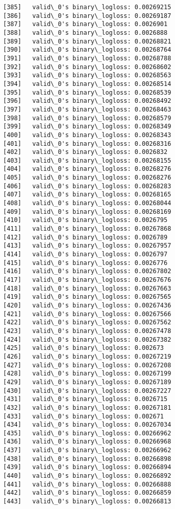 \documentclass[11pt]{article}
\begin{document}
\begin{Verbatim}[commandchars=\\\{\}]
[385]	valid\_0's binary\_logloss: 0.00269215
[386]	valid\_0's binary\_logloss: 0.00269187
[387]	valid\_0's binary\_logloss: 0.0026901
[388]	valid\_0's binary\_logloss: 0.0026888
[389]	valid\_0's binary\_logloss: 0.00268821
[390]	valid\_0's binary\_logloss: 0.00268764
[391]	valid\_0's binary\_logloss: 0.00268788
[392]	valid\_0's binary\_logloss: 0.00268602
[393]	valid\_0's binary\_logloss: 0.00268563
[394]	valid\_0's binary\_logloss: 0.00268514
[395]	valid\_0's binary\_logloss: 0.00268539
[396]	valid\_0's binary\_logloss: 0.00268492
[397]	valid\_0's binary\_logloss: 0.00268463
[398]	valid\_0's binary\_logloss: 0.00268579
[399]	valid\_0's binary\_logloss: 0.00268349
[400]	valid\_0's binary\_logloss: 0.00268343
[401]	valid\_0's binary\_logloss: 0.00268316
[402]	valid\_0's binary\_logloss: 0.0026832
[403]	valid\_0's binary\_logloss: 0.00268155
[404]	valid\_0's binary\_logloss: 0.00268276
[405]	valid\_0's binary\_logloss: 0.00268276
[406]	valid\_0's binary\_logloss: 0.00268283
[407]	valid\_0's binary\_logloss: 0.00268165
[408]	valid\_0's binary\_logloss: 0.00268044
[409]	valid\_0's binary\_logloss: 0.00268169
[410]	valid\_0's binary\_logloss: 0.0026795
[411]	valid\_0's binary\_logloss: 0.00267868
[412]	valid\_0's binary\_logloss: 0.0026789
[413]	valid\_0's binary\_logloss: 0.00267957
[414]	valid\_0's binary\_logloss: 0.0026797
[415]	valid\_0's binary\_logloss: 0.0026776
[416]	valid\_0's binary\_logloss: 0.00267802
[417]	valid\_0's binary\_logloss: 0.00267676
[418]	valid\_0's binary\_logloss: 0.00267663
[419]	valid\_0's binary\_logloss: 0.00267565
[420]	valid\_0's binary\_logloss: 0.00267436
[421]	valid\_0's binary\_logloss: 0.00267566
[422]	valid\_0's binary\_logloss: 0.00267562
[423]	valid\_0's binary\_logloss: 0.00267478
[424]	valid\_0's binary\_logloss: 0.00267382
[425]	valid\_0's binary\_logloss: 0.002673
[426]	valid\_0's binary\_logloss: 0.00267219
[427]	valid\_0's binary\_logloss: 0.00267208
[428]	valid\_0's binary\_logloss: 0.00267199
[429]	valid\_0's binary\_logloss: 0.00267189
[430]	valid\_0's binary\_logloss: 0.00267227
[431]	valid\_0's binary\_logloss: 0.0026715
[432]	valid\_0's binary\_logloss: 0.00267181
[433]	valid\_0's binary\_logloss: 0.002671
[434]	valid\_0's binary\_logloss: 0.00267034
[435]	valid\_0's binary\_logloss: 0.00266962
[436]	valid\_0's binary\_logloss: 0.00266968
[437]	valid\_0's binary\_logloss: 0.00266962
[438]	valid\_0's binary\_logloss: 0.00266898
[439]	valid\_0's binary\_logloss: 0.00266894
[440]	valid\_0's binary\_logloss: 0.00266892
[441]	valid\_0's binary\_logloss: 0.00266888
[442]	valid\_0's binary\_logloss: 0.00266859
[443]	valid\_0's binary\_logloss: 0.00266813

\end{Verbatim}
\end{document}
